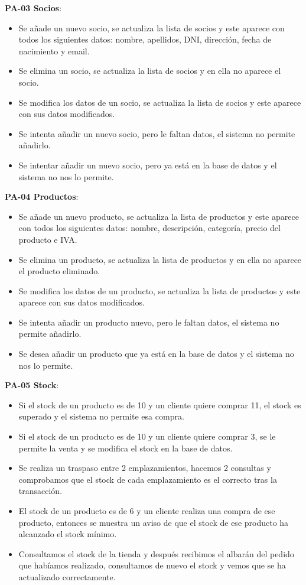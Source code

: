 \textbf{PA-03 Socios}:
\begin{itemize}
	\item Se añade un nuevo socio, se actualiza la lista de socios y este aparece con todos los siguientes datos: nombre, apellidos, DNI, dirección, fecha de nacimiento y email.
	\item Se elimina un socio, se actualiza la lista de socios y en ella no aparece el socio.
	\item Se modifica los datos de un socio, se actualiza la lista de socios y este aparece con sus datos modificados.
	\item Se intenta añadir un nuevo socio, pero le faltan datos, el sistema no permite añadirlo.
	\item Se intentar añadir un nuevo socio, pero ya está en la base de datos y el sistema no nos lo permite.
\end{itemize}

\textbf{PA-04 Productos}:
\begin{itemize}
	\item Se añade un nuevo producto, se actualiza la lista de productos y este aparece con todos los siguientes datos: nombre, descripción, categoría, precio del producto e IVA.
	\item Se elimina un producto, se actualiza la lista de productos y en ella no aparece el producto eliminado.
	\item Se modifica los datos de un producto, se actualiza la lista de productos y este aparece con sus datos modificados.
	\item Se intenta añadir un producto nuevo, pero le faltan datos, el sistema no permite añadirlo.
	\item Se desea añadir un producto que ya está en la base de datos y el sistema no nos lo permite.
\end{itemize}

\textbf{PA-05 Stock}:
\begin{itemize}
	\item Si el stock de un producto es de 10 y un cliente quiere comprar 11, el stock es superado y el sistema no permite esa compra.
	\item Si el stock de un producto es de 10 y un cliente quiere comprar 3, se le permite la venta y se modifica el stock en la base de datos.
	\item Se realiza un traspaso entre 2 emplazamientos, hacemos 2 consultas y comprobamos que el stock de cada emplazamiento es el correcto tras la transacción.
	\item El stock de un producto es de 6 y un cliente realiza una compra de ese producto, entonces se muestra un aviso de que el stock de ese producto ha alcanzado el stock mínimo.
	\item Consultamos el stock de la tienda y después recibimos el albarán del pedido que habíamos realizado, consultamos de nuevo el stock y vemos que se ha actualizado correctamente.
\end{itemize}

